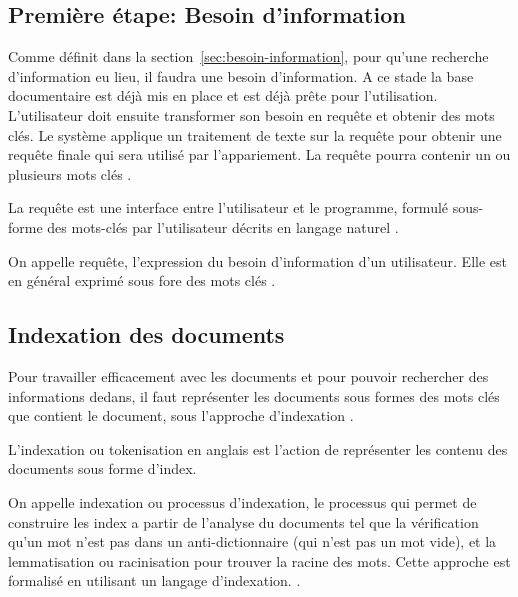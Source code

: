 \subsection{Première étape: Besoin d'information}
Comme définit dans la section~\ref{sec:besoin-information}, pour qu'une recherche d'information eu lieu, il faudra une besoin d'information. A ce stade la base documentaire est déjà mis en place et est déjà prête pour l'utilisation. L'utilisateur doit ensuite transformer son besoin en requête et obtenir des mots clés. Le système applique un traitement de texte sur la requête pour obtenir une requête finale qui sera utilisé par l'appariement. La requête pourra contenir un ou plusieurs mots clés \citep{modern-ir}.

\begin{definition}
    La requête est une interface entre l'utilisateur et le programme, formulé sous-forme des mots-clés par l'utilisateur décrits en langage naturel \citep{amelioration-ri-approche-semantique}.
\end{definition}

\begin{definition}
    On appelle requête, l'expression du besoin d'information d'un utilisateur. Elle est en général exprimé sous fore des mots clés \citep{salton1989automatique}.
\end{definition}

\subsection{Indexation des documents}
Pour travailler efficacement avec les documents et pour pouvoir rechercher des informations dedans, il faut représenter les documents sous formes des mots clés que contient le document, sous l'approche d'indexation \citep{ir-on-web}.

\begin{definition}
    L'indexation ou tokenisation en anglais est l'action de représenter les contenu des documents sous forme d'index.
\end{definition}

\begin{definition}
    On appelle indexation ou processus d'indexation, le processus qui permet de construire les index a partir de l'analyse du documents tel que la vérification qu'un mot n'est pas dans un anti-dictionnaire (qui n'est pas un mot vide), et la lemmatisation ou racinisation pour trouver la racine des mots. Cette approche est formalisé en utilisant un langage d'indexation. \citep{paradis:tel-00005009}.
\end{definition}

